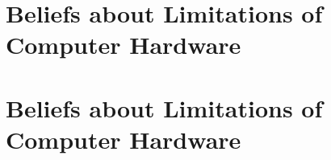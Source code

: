 \documentclass[sigconf,review,anonymous]{acmart}
\begin{document}

 





\section{Beliefs about Limitations of Computer Hardware}


\section{Beliefs about Limitations of Computer Hardware}

\end{document}
